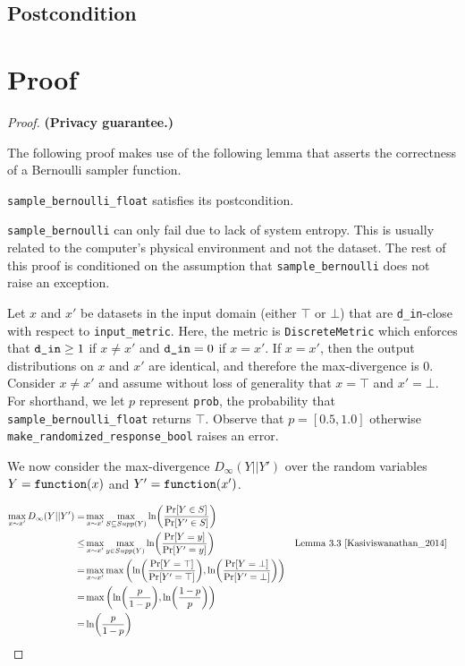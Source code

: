 \documentclass{article}
\begin{document}
\subsection*{Postcondition}


\section{Proof}

\begin{proof} 
\textbf{(Privacy guarantee.)} 

\begin{tcolorbox}
\begin{note}
    The following proof makes use of the following lemma that asserts the correctness of a Bernoulli sampler function.
    \begin{lemma}
        \texttt{sample\_bernoulli\_float} satisfies its postcondition.
    \end{lemma}
\end{note}
\end{tcolorbox}

\texttt{sample\_bernoulli} can only fail due to lack of system entropy. 
This is usually related to the computer's physical environment and not the dataset. 
The rest of this proof is conditioned on the assumption that \texttt{sample\_bernoulli} does not raise an exception. 

Let $x$ and $x'$ be datasets in the input domain (either $\top$ or $\bot$) that are \texttt{d\_in}-close with respect to \texttt{input\_metric}.
Here, the metric is \texttt{DiscreteMetric} which enforces that $\texttt{d\_in} \geq 1$ if $x \ne x'$ and $\texttt{d\_in} = 0$ if $x = x'$. 
If $x = x'$, then the output distributions on $x$ and $x'$ are identical, and therefore the max-divergence is 0.
Consider $x \ne x'$ and assume without loss of generality that $x = \top$ and $x' = \bot$. 
For shorthand, we let $p$ represent \texttt{prob}, the probability that \texttt{sample\_bernoulli\_float} returns $\top$. 
Observe that $p = [0.5, 1.0]$ otherwise \texttt{make\_randomized\_response\_bool} raises an error. 

We now consider the max-divergence $D_{\infty}(Y||Y')$ over the random variables $Y = \texttt{function}(x)$ and $Y' = \texttt{function}(x')$.

\begin{align*}
    \max_{x \sim x'} D_{\infty}(Y||Y')
    =& \max_{x \sim x'} \max_{S \subseteq Supp(Y)}\ln (\frac{\Pr[Y \in S]}{\Pr[Y' \in S]}) \\
    \le& \max_{x \sim x'} \max_{y \in Supp(Y)}\ln (\frac{\Pr[Y = y]}{\Pr[Y' = y]}) &&\text{Lemma 3.3 } \cite{Kasiviswanathan_2014} \\
    =& \max_{x \sim x'} \max\left(\ln (\frac{\Pr[Y = \top]}{\Pr[Y' = \top]}), \ln(\frac{\Pr[Y = \bot]}{\Pr[Y' = \bot]})\right) \\
    =& \max\left(\ln (\frac{p}{1 - p}), \ln(\frac{1 - p}{p})\right) \\
    =& \ln (\frac{p}{1 - p})
\end{align*}


\end{proof}
\end{document}
